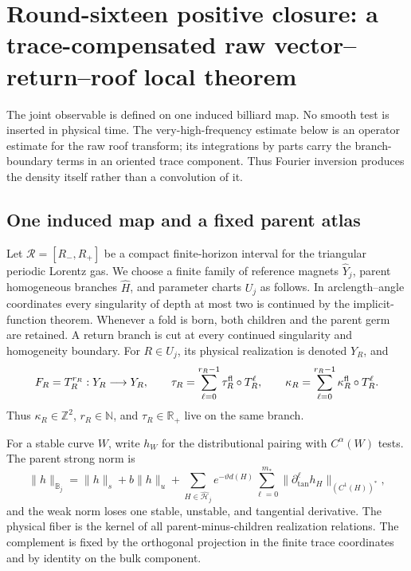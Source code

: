 \section{Round-sixteen positive closure: a trace-compensated raw vector--return--roof local theorem}
\label{sec:r16-a2}

The joint observable is defined on one induced billiard map.  No smooth test is
inserted in physical time.  The very-high-frequency estimate below is an
operator estimate for the raw roof transform; its integrations by parts carry
the branch-boundary terms in an oriented trace component.  Thus Fourier
inversion produces the density itself rather than a convolution of it.

\subsection{One induced map and a fixed parent atlas}

Let \(\mathcal R=[R_-,R_+]\) be a compact finite-horizon interval for the
triangular periodic Lorentz gas.  We choose a finite family of reference
magnets \(\widehat Y_j\), parent homogeneous branches \(\widehat H\), and
parameter charts \(U_j\) as follows.  In arclength--angle coordinates every
singularity of depth at most two is continued by the implicit-function theorem.
Whenever a fold is born, both children and the parent germ are retained.  A
return branch is cut at every continued singularity and homogeneity boundary.
For \(R\in U_j\), its physical realization is denoted \(Y_R\), and
\[
 F_R=T_R^{r_R}:Y_R\longrightarrow Y_R,
 \qquad
 \tau_R=\sum_{\ell=0}^{r_R-1}\tau_R^{\rm fl}\circ T_R^\ell,
 \qquad
 \kappa_R=\sum_{\ell=0}^{r_R-1}\kappa_R^{\rm fl}\circ T_R^\ell.
\]
Thus \(\kappa_R\in\mathbb Z^2\), \(r_R\in\mathbb N\), and
\(\tau_R\in\mathbb R_+\) live on the same branch.

For a stable curve \(W\), write \(h_W\) for the distributional pairing with
\(C^\alpha(W)\) tests.  The parent strong norm is
\[
 \|h\|_{\mathbb B_j}
 =\|h\|_{s}+b\|h\|_{u}
 +\sum_{H\in\widehat{\mathscr H}_j}e^{-\vartheta d(H)}
   \sum_{\ell=0}^{m_*}\|\partial_{\tan}^\ell h_H\|_{(C^1(H))^*},
\]
and the weak norm loses one stable, unstable, and tangential derivative.  The
physical fiber is the kernel of all parent-minus-children realization
relations.  The complement is fixed by the orthogonal projection in the finite
trace coordinates and by identity on the bulk component.

